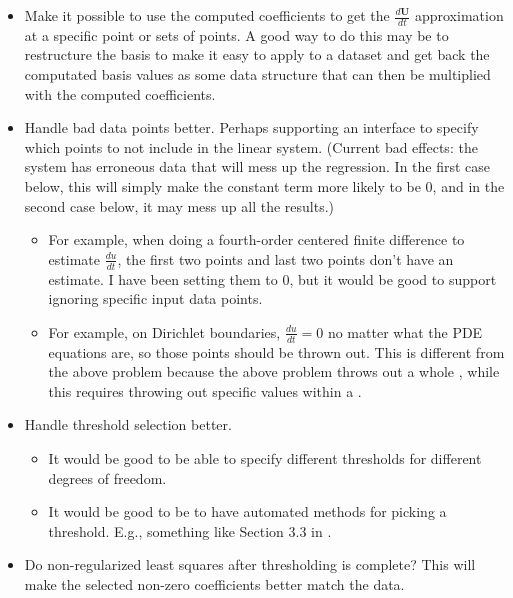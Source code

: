\documentclass{article}
\let\vec\mathbf
\def\lstinline#1{}%
\begin{document}
\begin{itemize}

    \item Make it possible to use the computed coefficients to get the
      $\frac{d\vec{U}}{dt}$ approximation at a specific point or sets of points.
      A good way to do this may be to restructure the basis to make it easy to
      apply to a dataset and get back the computated basis values as some data
      structure that can then be multiplied with the computed coefficients.

    \item Handle bad data points better. Perhaps supporting an interface to
      specify which points to not include in the linear system. (Current bad
      effects: the system has erroneous data that will mess up the regression.
      In the first case below, this will simply make the constant term more
      likely to be 0, and in the second case below, it may mess up all the
      results.)
    \begin{itemize}
        \item For example, when doing a fourth-order centered finite difference
          to estimate $\frac{du}{dt}$, the first two points and last two points
          don't have an estimate. I have been setting them to 0, but it would be
          good to support ignoring specific input data points.
        \item For example, on Dirichlet boundaries, $\frac{du}{dt} = 0$ no
          matter what the PDE equations are, so those points should be thrown
          out. This is different from the above problem because the above
          problem throws out a whole \lstinline{Vec}, while this requires
          throwing out specific values within a \lstinline{Vec}.
    \end{itemize}

    \item Handle threshold selection better.
    \begin{itemize}
        \item It would be good to be able to specify different thresholds for
          different degrees of freedom.
        \item It would be good to be to have automated methods for picking a
          threshold. E.g., something like Section 3.3 in \cite{shea2020sindy-bvp}.
    \end{itemize}

    \item Do non-regularized least squares after thresholding is complete? This
      will make the selected non-zero coefficients better match the data.


\end{itemize}
\end{document}
